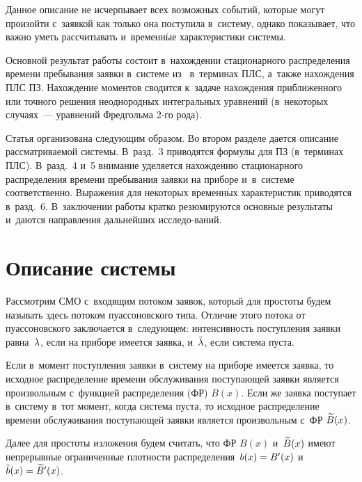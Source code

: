 \begin{multicols}{2}
Данное описание не исчерпывает всех возможных событий,
которые могут произойти с~заявкой как только она
поступила в~систему, однако показывает, что важно уметь рассчитывать
и~временн$\acute{\mbox{ы}}$е характеристики системы.

Основной результат работы состоит в~нахождении
стационарного распределения времени пребывания заявки в~системе
из~\cite{lataavrv} в~терминах ПЛС,
а~также нахождения ПЛС ПЗ.
Нахождение моментов
сводится к~задаче нахождения приближенного или точного решения
неоднородных интегральных уравнений (в~некоторых случаях~---
уравнений Фредгольма 2-го рода).

Статья организована следующим образом. Во втором разделе дается
описание рассматриваемой системы. В~разд.~3 приводятся формулы для
ПЗ (в~терминах ПЛС). В~разд.~4 и~5 внимание
уделяется нахождению стационарного распределения времени пребывания
заявки на приборе и~в~системе соответственно. Выражения для
некоторых временн$\acute{\mbox{ы}}$х характеристик приводятся в~разд.~6.
В~заключении работы кратко резюмируются основные результаты и~даются
направления дальнейших исследо-\linebreak ваний.

\vspace*{-6pt}

\section{Описание системы}

Рассмотрим СМО с~входящим потоком заявок,
который для простоты будем называть здесь
потоком пуассоновского типа. Отличие этого потока от пуассоновского
заключается в~следующем: интенсивность поступления заявки равна~$\lambda$,
если на приборе имеется заявка, и~$\tilde\lambda$, если система пуста.

Если в~момент поступления заявки в~систему
на приборе имеется заявка, то исходное
распределение времени обслуживания поступающей
заявки является произвольным с~функцией распределения (ФР) $B(x)$.
Если же заявка поступает в~систему в~тот
момент, когда система пуста, то исходное
распределение времени обслуживания поступающей
заявки является произвольным с~ФР $\widetilde B(x)$.

Далее для простоты изложения будем считать,
что ФР $B(x)$ и~$\widetilde B(x)$ имеют непрерывные
ограниченные плотности распределения~$b(x)\hm=B'(x)$ и~$\tb(x)\hm=\tB'(x)$.


\end{multicols}
